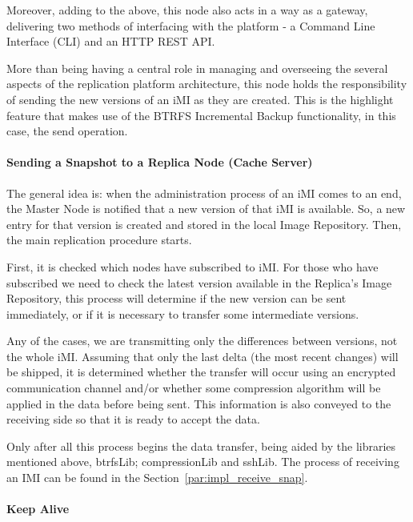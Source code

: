 Moreover, adding to the above, this node also acts in a way as a gateway, delivering two methods of interfacing with the platform - a Command Line Interface (CLI) and an HTTP REST API.

More than being having a central role in managing and overseeing the several aspects of the replication platform architecture, this node holds the responsibility of sending the new versions of an iMI as they are created. This is the highlight feature that makes use of the BTRFS Incremental Backup functionality, in this case, the send operation.

\paragraph{Sending a Snapshot to a Replica Node (Cache Server)}
\label{par:impl_sendsnap}

The general idea is: when the administration process of an iMI comes to an end, the Master Node is notified that a new version of that iMI is available. So, a new entry for that version is created and stored in the local Image Repository. Then, the main replication procedure starts. 

First, it is checked which nodes have subscribed to iMI. For those who have subscribed we need to check the latest version available in the Replica's Image Repository, this process will determine if the new version can be sent immediately, or if it is necessary to transfer some intermediate versions. 

Any of the cases, we are transmitting only the differences between versions, not the whole iMI. Assuming that only the last delta (the most recent changes) will be shipped, it is determined whether the transfer will occur using an encrypted communication channel and/or whether some compression algorithm will be applied in the data before being sent. This information is also conveyed to the receiving side so that it is ready to accept the data. 

Only after all this process begins the data transfer, being aided by the libraries mentioned above, btrfsLib; compressionLib and sshLib. The process of receiving an IMI can be found in the Section~\ref{par:impl_receive_snap}.

\paragraph{Keep Alive}
\label{par:impl_icbdrep_keep_alive}



